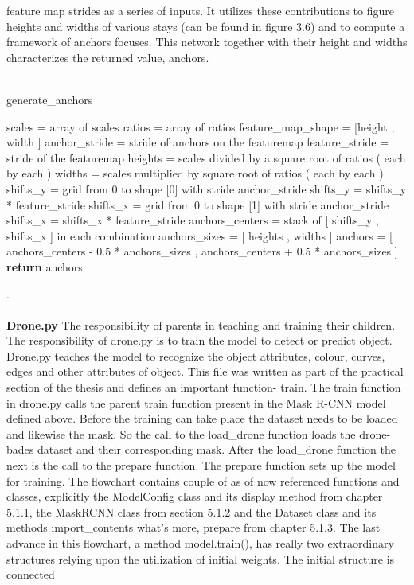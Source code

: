 feature map strides as a series of inputs. It utilizes these contributions to figure heights and widths of various stays (can be found in figure 3.6) and to compute a framework of anchors
focuses. This network together with their height and widths characterizes the returned value, anchors.
\\
\\
\begin{algorithm}[H]
  \caption{generate\_anchors}
  \SetAlgoLined
  \DontPrintSemicolon
  scales = array of scales\;
ratios = array of ratios\;
feature\_map\_shape = [height , width ]\;
anchor\_stride = stride of anchors on the featuremap\;
feature\_stride = stride of the featuremap\;
 heights = scales divided by a square root of ratios ( each by each )\;
 widths = scales multiplied by square root of ratios ( each by each )\;
 shifts\_y = grid from 0 to shape [0] with stride anchor\_stride\;
 shifts\_y = shifts\_y * feature\_stride\;
 shifts\_x = grid from 0 to shape [1] with stride anchor\_stride\;
 shifts\_x = shifts\_x * feature\_stride\;
 anchors\_centers = stack of [ shifts\_y , shifts\_x ] in each combination\;
anchors\_sizes = [ heights , widths ]\;
anchors = [ anchors\_centers - 0.5 * anchors\_sizes , anchors\_centers + 0.5 * anchors\_sizes ]\;
\textbf{return} anchors
\end{algorithm}
.\\
\\
\textbf{Drone.py}
The responsibility of parents in teaching and training their children. The responsibility of drone.py is to train the model to detect or predict object. Drone.py teaches the model to recognize the object attributes, colour, curves, edges and other attributes of object. This file was written as part of the practical section of the thesis and defines an important function- train. The train function in drone.py calls the parent train function present in the Mask R-CNN model defined above.  Before the training can take place the dataset needs to be loaded and likewise the mask. So the call to the load\_drone function loads the drone-bades dataset and their corresponding mask.   After the load\_drone function the next is the call to the prepare function. The prepare function sets up the model for training.
The flowchart contains couple of as of now referenced functions and classes, explicitly the ModelConfig class and its display method from chapter 5.1.1, the MaskRCNN 
class from section 5.1.2 and the Dataset class and its methods import\_contents what's more, prepare from chapter 5.1.3. 
The last advance in this flowchart, a method model.train(), has really two extraordinary structures relying upon the utilization of initial weights. The initial structure is connected 
